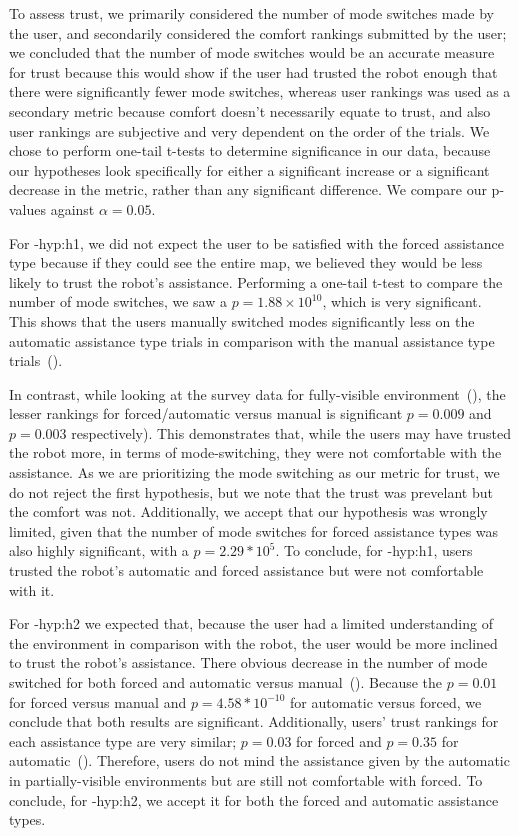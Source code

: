 To assess trust, we primarily considered the number of mode switches made by the user, and secondarily considered the comfort rankings submitted by the user; we concluded that the number of mode switches would be an accurate measure for trust because this would show if the user had trusted the robot enough that there were significantly fewer mode switches, whereas user rankings was used as a secondary metric because comfort doesn’t necessarily equate to trust, and also user rankings are subjective and very dependent on the order of the trials. We chose to perform one-tail t-tests to determine significance in our data, because our hypotheses look specifically for either a significant increase or a significant decrease in the metric, rather than any significant difference. We compare our p-values against $\alpha = 0.05$.

For \hyp{hyp:h1}, we did not expect the user to be satisfied with the forced assistance type because if they could see the entire map, we believed they would be less likely to trust the robot's assistance. Performing a one-tail t-test to compare the number of mode switches, we saw a $p = 1.88 \times 10^{10}$, which is very significant. This shows that the users manually switched modes significantly less on the automatic assistance type trials in comparison with the manual assistance type trials~().  

In contrast, while looking at the survey data for fully-visible environment~(), the lesser rankings for forced/automatic versus manual is significant $p =  0.009$ and $p = 0.003$ respectively). This demonstrates that, while the users may have trusted the robot more, in terms of mode-switching, they were not comfortable with the assistance. As we are prioritizing the mode switching as our metric for trust, we do not reject the first hypothesis, but we note that the trust was prevelant but the comfort was not. Additionally, we accept that our hypothesis was wrongly limited, given that the number of mode switches for forced assistance types was also highly significant, with a $p = 2.29 * 10^5$. To conclude, for \hyp{hyp:h1}, users trusted the robot's automatic and forced assistance but were not comfortable with it.

For \hyp{hyp:h2} we expected that, because the user had a limited understanding of the environment in comparison with the robot, the user would be more inclined to trust the robot's assistance. There obvious decrease in the number of mode switched for both forced and automatic versus manual~(). Because the $p = 0.01$ for forced versus manual and $p = 4.58 * 10^{-10}$ for automatic versus forced, we conclude that both results are significant. Additionally, users’ trust rankings for each assistance type are very similar; $p=0.03$ for forced and $p=0.35$ for automatic~(). Therefore, users do not mind the assistance given by the automatic in partially-visible environments but are still not comfortable with forced. To conclude, for \hyp{hyp:h2}, we accept it for both the forced and automatic assistance types.

